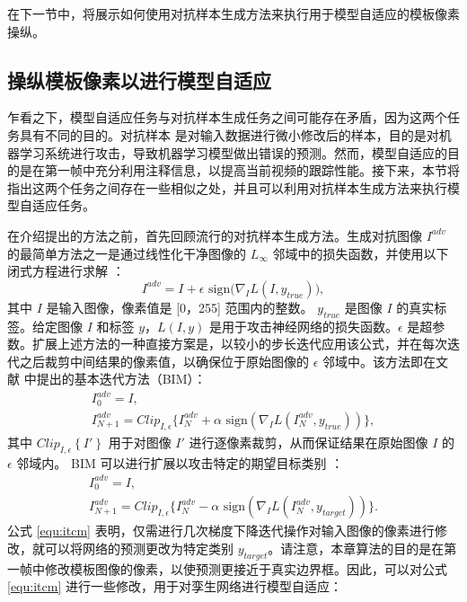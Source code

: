 在下一节中，将展示如何使用对抗样本生成方法来执行用于模型自适应的模板像素操纵。

\subsection{操纵模板像素以进行模型自适应}
乍看之下，模型自适应任务与对抗样本生成任务之间可能存在矛盾，因为这两个任务具有不同的目的。对抗样本 \cite{kurakin2017adversarial} 是对输入数据进行微小修改后的样本，目的是对机器学习系统进行攻击，导致机器学习模型做出错误的预测。然而，模型自适应的目的是在第一帧中充分利用注释信息，以提高当前视频的跟踪性能。接下来，本节将指出这两个任务之间存在一些相似之处，并且可以利用对抗样本生成方法来执行模型自适应任务。

在介绍提出的方法之前，首先回顾流行的对抗样本生成方法。生成对抗图像 $I^{adv}$ 的最简单方法之一是通过线性化干净图像的 $L_{\infty}$ 邻域中的损失函数，并使用以下闭式方程进行求解 \cite{FGSM}：
\begin{equation}
    I^{adv} = I + \epsilon \text{ sign} \bigl( \nabla_I L(I, y_{true})  \bigr),
\end{equation}
其中 $I$ 是输入图像，像素值是 [0，255] 范围内的整数。 $y_{true}$ 是图像 $I$ 的真实标签。给定图像 $I$ 和标签 $y$，$L(I, y)$ 是用于攻击神经网络的损失函数。$\epsilon$ 是超参数。扩展上述方法的一种直接方案是，以较小的步长迭代应用该公式，并在每次迭代之后裁剪中间结果的像素值，以确保位于原始图像的 $\epsilon$ 邻域中。该方法即在文献 \cite{kurakin2017adversarial} 中提出的基本迭代方法（BIM）：
\begin{equation}
    \begin{gathered}
        I_0^{adv} = I, \\
        I_{N+1}^{adv} = Clip_{I,\epsilon}\{I_N^{adv}+\alpha \text{ sign}(\nabla_I L(I_N^{adv},y_{true}))\},
    \end{gathered}
\end{equation}
其中 $Clip_{I, \epsilon} \left\{ I' \right\}$ 用于对图像 $I'$ 进行逐像素裁剪，从而保证结果在原始图像 $I$ 的 $\epsilon$ 邻域内。
BIM 可以进行扩展以攻击特定的期望目标类别 \cite{kurakin2017adversarial}：
\begin{equation}
    \begin{gathered}
        I_0^{adv} = I,\\
        I_{N+1}^{adv} = Clip_{I,\epsilon}\{I_N^{adv}-\alpha \text{ sign}(\nabla_I L(I_N^{adv},y_{target}))\}.
    \end{gathered}
    \label{equ:itcm}
\end{equation}
公式 \ref{equ:itcm} 表明，仅需进行几次梯度下降迭代操作对输入图像的像素进行修改，就可以将网络的预测更改为特定类别 $y_{target}$。请注意，本章算法的目的是在第一帧中修改模板图像的像素，以使预测更接近于真实边界框。因此，可以对公式 \ref{equ:itcm} 进行一些修改，用于对孪生网络进行模型自适应：
